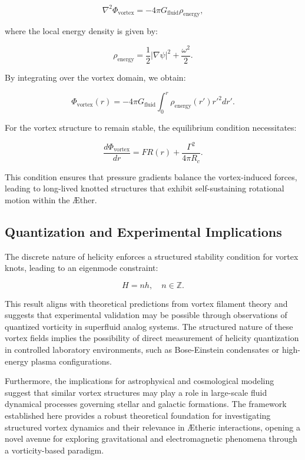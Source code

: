 \begin{equation*}
\nabla^2 \Phi_{\text{vortex}} = -4\pi G_{\text{fluid}} \rho_{\text{energy}},
\end{equation*}

where the local energy density is given by:

\begin{equation*}
\rho_{\text{energy}} = \frac{1}{2} |\nabla \psi|^2 + \frac{\omega^2}{2}.
\end{equation*}

By integrating over the vortex domain, we obtain:

\begin{equation*}
\Phi_{\text{vortex}}(r) = -4\pi G_{\text{fluid}} \int_0^r \rho_{\text{energy}}(r') r'^2 dr'.
\end{equation*}

For the vortex structure to remain stable, the equilibrium condition necessitates:

\begin{equation*}
\frac{d\Phi_{\text{vortex}}}{dr} = F R(r) + \frac{\Gamma^2}{4 \pi R_c}.
\end{equation*}

This condition ensures that pressure gradients balance the vortex-induced forces, leading to long-lived knotted structures that exhibit self-sustaining rotational motion within the \AE ther.

\subsection{Quantization and Experimental Implications}
The discrete nature of helicity enforces a structured stability condition for vortex knots, leading to an eigenmode constraint:

\begin{equation*}
H = n h, \quad n \in \mathbb{Z}.
\end{equation*}

This result aligns with theoretical predictions from vortex filament theory and suggests that experimental validation may be possible through observations of quantized vorticity in superfluid analog systems. The structured nature of these vortex fields implies the possibility of direct measurement of helicity quantization in controlled laboratory environments, such as Bose-Einstein condensates or high-energy plasma configurations.

Furthermore, the implications for astrophysical and cosmological modeling suggest that similar vortex structures may play a role in large-scale fluid dynamical processes governing stellar and galactic formations. The framework established here provides a robust theoretical foundation for investigating structured vortex dynamics and their relevance in \AE theric interactions, opening a novel avenue for exploring gravitational and electromagnetic phenomena through a vorticity-based paradigm.




